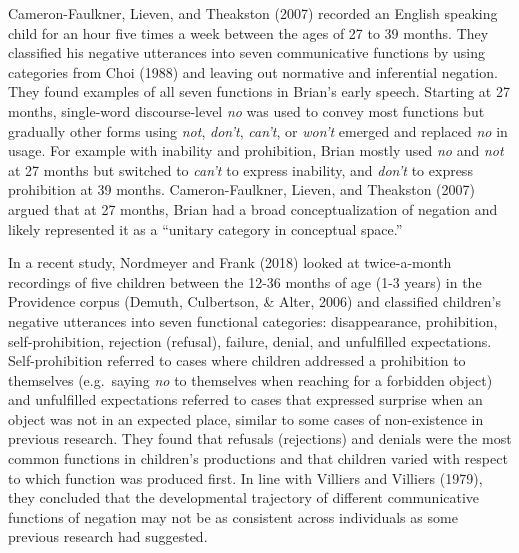 \documentclass[
  english,
  man,floatsintext]{apa6}
\begin{document}
Cameron-Faulkner, Lieven, and Theakston (2007) recorded an English speaking child for an hour five times a week between the ages of 27 to 39 months. They classified his negative utterances into seven communicative functions by using categories from Choi (1988) and leaving out normative and inferential negation. They found examples of all seven functions in Brian's early speech. Starting at 27 months, single-word discourse-level \emph{no} was used to convey most functions but gradually other forms using \emph{not}, \emph{don't}, \emph{can't}, or \emph{won't} emerged and replaced \emph{no} in usage. For example with inability and prohibition, Brian mostly used \emph{no} and \emph{not} at 27 months but switched to \emph{can't} to express inability, and \emph{don't} to express prohibition at 39 months. Cameron-Faulkner, Lieven, and Theakston (2007) argued that at 27 months, Brian had a broad conceptualization of negation and likely represented it as a ``unitary category in conceptual space.''

In a recent study, Nordmeyer and Frank (2018) looked at twice-a-month recordings of five children between the 12-36 months of age (1-3 years) in the Providence corpus (Demuth, Culbertson, \& Alter, 2006) and classified children's negative utterances into seven functional categories: disappearance, prohibition, self-prohibition, rejection (refusal), failure, denial, and unfulfilled expectations. Self-prohibition referred to cases where children addressed a prohibition to themselves (e.g.~saying \emph{no} to themselves when reaching for a forbidden object) and unfulfilled expectations referred to cases that expressed surprise when an object was not in an expected place, similar to some cases of non-existence in previous research. They found that refusals (rejections) and denials were the most common functions in children's productions and that children varied with respect to which function was produced first. In line with Villiers and Villiers (1979), they concluded that the developmental trajectory of different communicative functions of negation may not be as consistent across individuals as some previous research had suggested.
\end{document}

